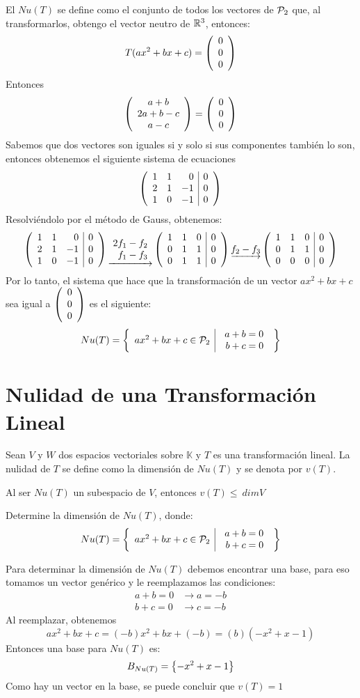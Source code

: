 \begin{sol}
El $Nu(T)$ se define como el conjunto de todos los vectores de $\pdos$ que, al transformarlos, obtengo el vector neutro de $\rtres$, entonces:
$$T(ax^2 + bx + c) = \vectrtrescent{0}{0}{0}$$
Entonces
$$\vectrtrescent{a+b}{2a+b-c}{a-c} = \vectrtrescent{0}{0}{0}$$
Sabemos que dos vectores son iguales si y solo si sus componentes también lo son, entonces obtenemos el siguiente sistema de ecuaciones
$$\reducir{rrr|r}{
1&1&0&0\\
2&1&-1&0\\
1&0&-1&0
}$$
Resolviéndolo por el método de Gauss, obtenemos:
$$\reducir{rrr|r}{
1&1&0&0\\
2&1&-1&0\\
1&0&-1&0
}
\underrightarrow{\begin{array}{r}
    2f_1 - f_2\\
    f_1 - f_3
\end{array}}
\reducir{rrr|r}{
1&1&0&0\\
0&1&1&0\\
0&1&1&0
}
\underrightarrow{f_2 - f_3}
\reducir{rrr|r}{
1&1&0&0\\
0&1&1&0\\
0&0&0&0
}$$
Por lo tanto, el sistema que hace que la transformación de un vector $ax^2 + bx +c$ sea igual a $\vectrtrescent{0}{0}{0}$ es el siguiente:
$$\svpdos{Nu(T)}{a}{b}{c}{\begin{array}{r}
        a + b = 0\\
        b + c = 0
    \end{array}}$$
\end{sol}
\section{Nulidad de una Transformación Lineal}
\begin{dfn}
Sean $V$ y $W$ dos espacios vectoriales sobre $\mathbb{K}$ y $T$ es una transformación lineal. La nulidad de $T$ se define como la dimensión de $Nu(T)$ y se denota por $v(T)$. 
\end{dfn}
\begin{theorem}[Corolario]
Al ser $Nu(T)$ un subespacio de $V$, entonces $v(T) \leq~dimV$
\end{theorem} 
\begin{ejemplo}
Determine la dimensión de $Nu(T)$, donde:
$$\svpdos{Nu(T)}{a}{b}{c}{\begin{array}{r}
        a + b = 0\\
        b + c = 0
    \end{array}}$$
\end{ejemplo}
\begin{sol}
Para determinar la dimensión de $Nu(T)$ debemos encontrar una base, para eso tomamos un vector genérico y le reemplazamos las condiciones:
\begin{align*}
    a + b = 0 &\rightarrow a = -b\\
    b + c = 0 &\rightarrow c = -b
\end{align*}
Al reemplazar, obtenemos
$$ax^2 + bx +c = (-b)x^2 + bx + (-b) = (b)(-x^2 + x - 1)$$
Entonces una base para $Nu(T)$ es:
$$B_{Nu(T)} = \llav{-x^2 + x -1}$$
Como hay un vector en la base, se puede concluir que $v(T) = 1$
\end{sol}
